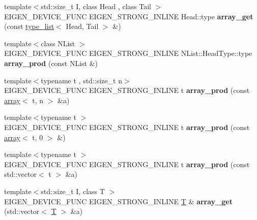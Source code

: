 \begin{DoxyCompactItemize}
{\footnotesize template$<$std\+::size\+\_\+t I, class Head , class Tail $>$ }\\E\+I\+G\+E\+N\+\_\+\+D\+E\+V\+I\+C\+E\+\_\+\+F\+U\+NC E\+I\+G\+E\+N\+\_\+\+S\+T\+R\+O\+N\+G\+\_\+\+I\+N\+L\+I\+NE Head\+::type {\bfseries array\+\_\+get} (const \hyperlink{struct_eigen_1_1internal_1_1type__list}{type\+\_\+list}$<$ Head, Tail $>$ \&)
\item 
\mbox{\label{namespace_eigen_1_1internal_aaeaf3a13ce50dc5e442699c6f2016da4}} 
{\footnotesize template$<$class N\+List $>$ }\\E\+I\+G\+E\+N\+\_\+\+D\+E\+V\+I\+C\+E\+\_\+\+F\+U\+NC E\+I\+G\+E\+N\+\_\+\+S\+T\+R\+O\+N\+G\+\_\+\+I\+N\+L\+I\+NE N\+List\+::\+Head\+Type\+::type {\bfseries array\+\_\+prod} (const N\+List \&)
\item 
\mbox{\label{namespace_eigen_1_1internal_aae558b85fe16a5839a5a06e2fba44853}} 
{\footnotesize template$<$typename t , std\+::size\+\_\+t n$>$ }\\E\+I\+G\+E\+N\+\_\+\+D\+E\+V\+I\+C\+E\+\_\+\+F\+U\+NC E\+I\+G\+E\+N\+\_\+\+S\+T\+R\+O\+N\+G\+\_\+\+I\+N\+L\+I\+NE t {\bfseries array\+\_\+prod} (const \hyperlink{class_eigen_1_1array}{array}$<$ t, n $>$ \&a)
\item 
\mbox{\label{namespace_eigen_1_1internal_af909d2e1930fa4c9173032d36f0d049e}} 
{\footnotesize template$<$typename t $>$ }\\E\+I\+G\+E\+N\+\_\+\+D\+E\+V\+I\+C\+E\+\_\+\+F\+U\+NC E\+I\+G\+E\+N\+\_\+\+S\+T\+R\+O\+N\+G\+\_\+\+I\+N\+L\+I\+NE t {\bfseries array\+\_\+prod} (const \hyperlink{class_eigen_1_1array}{array}$<$ t, 0 $>$ \&)
\item 
\mbox{\label{namespace_eigen_1_1internal_a82c39f9074b81bfdaa93e264f64a3306}} 
{\footnotesize template$<$typename t $>$ }\\E\+I\+G\+E\+N\+\_\+\+D\+E\+V\+I\+C\+E\+\_\+\+F\+U\+NC E\+I\+G\+E\+N\+\_\+\+S\+T\+R\+O\+N\+G\+\_\+\+I\+N\+L\+I\+NE t {\bfseries array\+\_\+prod} (const std\+::vector$<$ t $>$ \&a)
\item 
\mbox{\label{namespace_eigen_1_1internal_a43f4c03a70d77655d99d292e753c051b}} 
{\footnotesize template$<$std\+::size\+\_\+t I, class T $>$ }\\E\+I\+G\+E\+N\+\_\+\+D\+E\+V\+I\+C\+E\+\_\+\+F\+U\+NC E\+I\+G\+E\+N\+\_\+\+S\+T\+R\+O\+N\+G\+\_\+\+I\+N\+L\+I\+NE \hyperlink{group___sparse_core___module}{T} \& {\bfseries array\+\_\+get} (std\+::vector$<$ \hyperlink{group___sparse_core___module}{T} $>$ \&a)

\end{DoxyCompactItemize}
